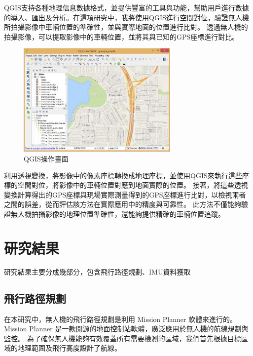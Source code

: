 \documentclass[12pt]{article}       %
\begin{document}
QGIS支持各種地理信息數據格式，並提供豐富的工具與功能，幫助用戶進行數據的導入、匯出及分析。在這項研究中，我將使用QGIS進行空間對位，驗證無人機所拍攝影像中車輛位置的準確性，並與實際地面的位置進行比對。
透過無人機的拍攝影像，可以提取影像中的車輛位置，並將其與已知的GPS座標進行對比。
\begin{figure}[H]
    \centering
    \includegraphics[width=0.7\textwidth]{qgis.jpg}     %
    \caption{QGIS操作畫面\cite{qgis_2020}}    %
    \label{fig:qgis}    %
\end{figure}
利用透視變換，將影像中的像素座標轉換成地理座標，並使用QGIS來執行這些座標的空間對位，將影像中的車輛位置對應到地面實際的位置。
接著，將這些透視變換計算得出的GPS座標與現場實際測量得到的GPS座標進行比對，以檢視兩者之間的誤差，從而評估該方法在實際應用中的精度與可靠性。
此方法不僅能夠驗證無人機拍攝影像的地理位置準確性，還能夠提供精確的車輛位置追蹤。


\section{\centering 研究結果}
\hspace{2em}研究結果主要分成幾部分，包含飛行路徑規劃、IMU資料獲取


\subsection{飛行路徑規劃}
\hspace{2em}在本研究中，無人機的飛行路徑規劃是利用 Mission Planner 軟體來進行的。
Mission Planner 是一款開源的地面控制站軟體，廣泛應用於無人機的航線規劃與監控。
為了確保無人機能夠有效覆蓋所有需要檢測的區域，我們首先根據目標區域的地理範圍及飛行高度設計了航線。
\end{document}
